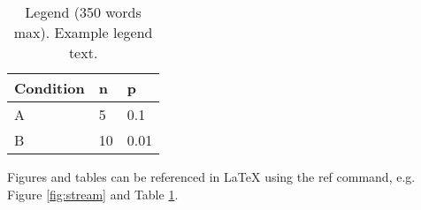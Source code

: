 \documentclass[fleqn,10pt]{wlscirep}
\begin{document}




\begin{table}[ht]
\centering
\begin{tabular}{|l|l|l|}
\hline
Condition & n & p \\
\hline
A & 5 & 0.1 \\
\hline
B & 10 & 0.01 \\
\hline
\end{tabular}
\caption{\label{tab:example}Legend (350 words max). Example legend text.}
\end{table}

Figures and tables can be referenced in LaTeX using the ref command, e.g. Figure \ref{fig:stream} and Table \ref{tab:example}.
\end{document}
